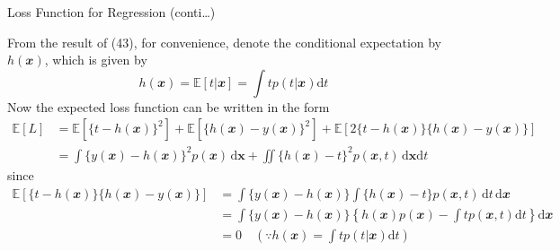 \documentclass{bredelebeamer}
\begin{document}
\begin{frame}{Loss Function for Regression (conti\ldots)}
  \begin{justify}
    From the result of (43), for convenience, denote the conditional expectation
    by $h(\mathbfit{x})$, which is given by
    \begin{equation}
      h(\mathbfit{x})
      = \mathbb{E}[t|\mathbfit{x}]
      = \int t p(t | \mathbfit{x}) \mathrm{d}t
    \end{equation}
    Now the expected loss function can be written in the form
    \begin{equation}
      \begin{split}
        \mathbb{E}[L]
        &= \mathbb{E}[{\{t-h(\mathbfit{x})\}}^2] + \mathbb{E}[{\{h(\mathbfit{x})-y(\mathbfit{x})\}}^2]
        + \mathbb{E}[2{\{t-h(\mathbfit{x})\}}{\{h(\mathbfit{x})-y(\mathbfit{x})\}}] \\
        &= \int {\{y(\mathbfit{x}) - h(\mathbfit{x})\}}^2 p(\mathbfit{x}) \, \mathrm{d}\mathbf{x}
        + \iint {\{h(\mathbfit{x}) - t\}}^2 p(\mathbfit{x}, t) \, \mathrm{d}\mathbf{x} \mathrm{d}t
      \end{split}
    \end{equation}
    since
    \begin{equation}
      \begin{split}
        \mathbb{E}[{\{t-h(\mathbfit{x})\}}{\{h(\mathbfit{x})-y(\mathbfit{x})\}}]
        &= \int {\{y(\mathbfit{x})-h(\mathbfit{x})\}} \int {\{h(\mathbfit{x})-t\}} p(\mathbfit{x},t) \, \mathrm{d}t \, \mathrm{d}\mathbfit{x}  \\
        &= \int {\{y(\mathbfit{x})-h(\mathbfit{x})\}} {\left\{h(\mathbfit{x})p(\mathbfit{x}) - \int t p(\mathbfit{x}, t) \mathrm{d}t \right\}} \mathrm{d}\mathbfit{x}\\
        &= 0 \quad \left(\because h(\mathbfit{x}) = \int t p(t|\mathbfit{x}) \mathrm{d}t \right)
      \end{split}
    \end{equation}
  \end{justify}
\end{frame}
\end{document}
